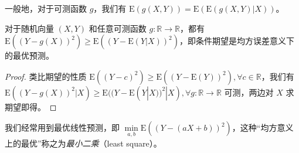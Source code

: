 \documentclass[../main.tex]{subfiles}
\begin{document}
一般地，对于可测函数 $g$，我们有 $\mathrm E(g(X,Y))=\mathrm E(\mathrm E(g(X,Y)|X))$。

\begin{theorem}\label{thm:4.7.2}
    对于随机向量 $(X,Y)$ 和任意可测函数 $g:\mathbb R\rightarrow\mathbb R$，都有 $\mathrm E((Y-g(X))^2)\geq \mathrm E((Y-\mathrm E(Y|X))^2)$，即条件期望是均方误差意义下的最优预测。
\end{theorem}

\begin{proof}
    类比期望的性质 $\mathrm E((Y-c)^2)\geq\mathrm E((Y-\mathrm E(Y))^2),\forall c\in\mathbb R$，我们有 $\mathrm E((Y-g(X))^2|X)\geq\mathrm E((Y-\mathrm E(Y|X))^2|X),\forall g:\mathbb R\rightarrow\mathbb R$ 可测，两边对 $X$ 求期望即得。
\end{proof}

我们经常用到最优线性预测，即 $\min\limits_{a,b}\mathrm E((Y-(aX+b))^2)$，这种“均方意义上的最优”称之为\emph{最小二乘}（least square）。

\end{document}
